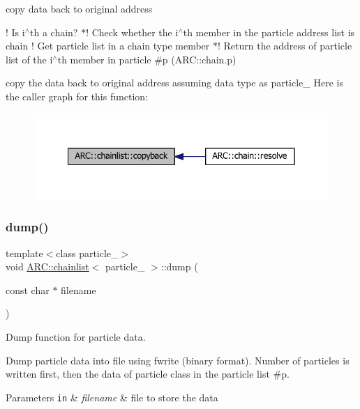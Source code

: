 copy data back to original address 

! Is i$^\wedge$th a chain? $\ast$! Check whether the i$^\wedge$th member in the particle address list is chain ! Get particle list in a chain type member $\ast$! Return the address of particle list of the i$^\wedge$th member in particle \#p (A\+R\+C\+::chain.\+p)

copy the data back to original address assuming data type as particle\+\_\+ Here is the caller graph for this function\+:
\nopagebreak
\begin{figure}[H]
\begin{center}
\leavevmode
\includegraphics[width=342pt]{classARC_1_1chainlist_aba70559e1b70882256a7805744e22b25_icgraph}
\end{center}
\end{figure}
\hypertarget{classARC_1_1chainlist_a4b42fabdc7ff6edca56ce65b316f581f}{}\label{classARC_1_1chainlist_a4b42fabdc7ff6edca56ce65b316f581f} 
\subsubsection{\texorpdfstring{dump()}{dump()}}
{\footnotesize\ttfamily template$<$class particle\+\_\+$>$ \\
void \hyperlink{classARC_1_1chainlist}{A\+R\+C\+::chainlist}$<$ particle\+\_\+ $>$\+::dump (\begin{DoxyParamCaption}\item[{const char $\ast$}]{filename }\end{DoxyParamCaption})\hspace{0.3cm}{\ttfamily [inline]}}



Dump function for particle data. 

Dump particle data into file using fwrite (binary format). Number of particles is written first, then the data of particle class in the particle list \#p. 
\begin{DoxyParams}[1]{Parameters}
\mbox{\tt in}  & {\em filename} & file to store the data \\
\hline
\end{DoxyParams}
\hypertarget{classARC_1_1chainlist_a0e19bd06e5aa685e88948c947cd06552}{}\label{classARC_1_1chainlist_a0e19bd06e5aa685e88948c947cd06552} 
